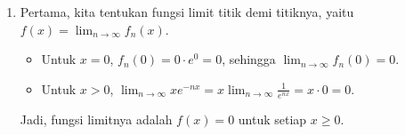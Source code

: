 \documentclass[12pt,openany,a4paper]{article}
\newtheorem*{teorema}{Teorema}
\begin{document}
\begin{enumerate}
\begin{itemize}
        \item \textbf{Mengecek konvergensi seragam}:
        \begin{teorema}
            Misalkan $f_n$ barisan fungsi kontinu pada himpunan $A$. Jika $(f_n)$ konvergen seragam ke fungsi $f$ pada $A$, maka fungsi limit $f$ juga kontinu pada $A$.
        \end{teorema}
        Berdasarkan teorema di atas, kita dapat menguji konvergensi seragam dengan cara yang lebih mudah: jika fungsi limit $f$ \textbf{tidak kontinu}, maka pasti $(f_n)$ \textbf{tidak konvergen seragam} (menggunakan prinsip kontraposisi).\\
        Perhatikan bahwa tiap $f_n(x) = \frac{1}{1+x^n}$ adalah fungsi kontinu pada interval $[0,1]$.
        Namun, fungsi limit $f(x)$ tidak kontinu pada $[0,1]$ (khususnya terputus di $x=1$, karena $\lim_{x \to 1^-} f(x) = 1 \neq f(1) = \frac{1}{2}$).
        Karena fungsi limit $f$ tidak kontinu, maka dengan kontraposisi dapat disimpulkan bahwa barisan $(f_n)$ \textbf{tidak konvergen seragam} ke $f$ pada $[0,1]$.
    \end{itemize}
    
    \item 
    Pertama, kita tentukan fungsi limit titik demi titiknya, yaitu $f(x) = \lim_{n \to \infty} f_n(x)$.
    \begin{itemize}
        \item Untuk $x = 0$, $f_n(0) = 0 \cdot e^0 = 0$, sehingga $\lim_{n\to\infty} f_n(0) = 0$.
        \item Untuk $x > 0$, $\lim_{n\to\infty} xe^{-nx} = x \lim_{n\to\infty} \frac{1}{e^{nx}} = x \cdot 0 = 0$.
    \end{itemize}
    Jadi, fungsi limitnya adalah $f(x) = 0$ untuk setiap $x \ge 0$.
    

\end{enumerate}
\end{document}
